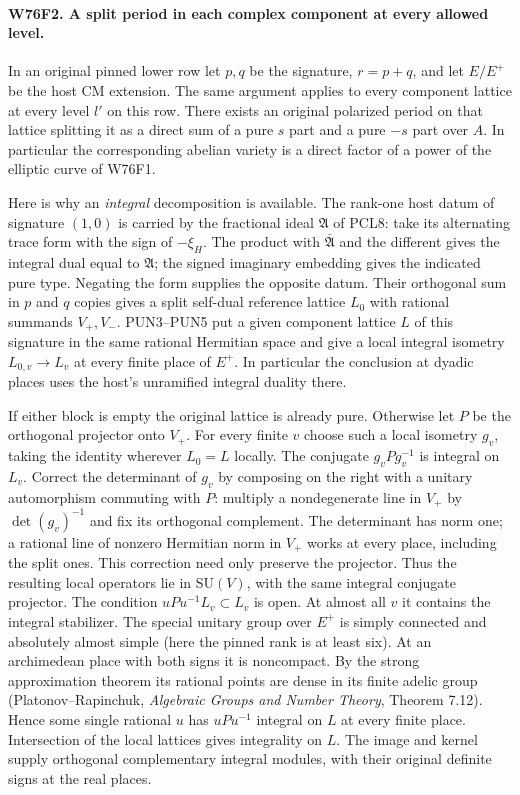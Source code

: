 \paragraph{W76F2. A split period in each complex component at every allowed level.}
In an original pinned lower row let $p,q$ be the signature,
$r=p+q$, and let $E/E^+$ be the host CM extension. The same
argument applies to every component lattice at every level
$l'$ on this row. There exists an original polarized period on
that lattice splitting it as a direct sum of a pure $s$ part
and a pure $-s$ part over $A$. In particular the corresponding
abelian variety is a direct factor of a power of the elliptic
curve of W76F1.

Here is why an \emph{integral} decomposition is available.
The rank-one host datum of signature $(1,0)$ is carried by the
fractional ideal $\mathfrak A$ of PCL8: take its alternating trace
form with the sign of $-\xi_H$. The product with $\bar{\mathfrak A}$
and the different gives the integral dual equal to $\mathfrak A$;
the signed imaginary embedding gives the indicated pure type.
Negating the form supplies the opposite datum. Their orthogonal
sum in $p$ and $q$ copies gives a split self-dual reference lattice
$L_0$ with rational summands $V_+,V_-$. PUN3--PUN5 put a given
component lattice $L$ of this signature in the same rational
Hermitian space and give a local integral isometry $L_{0,v}\to L_v$
at every finite place of $E^+$. In particular the conclusion at
dyadic places uses the host's unramified integral duality there.

If either block is empty the original lattice is already pure.
Otherwise let $P$ be the orthogonal projector onto $V_+$.
For every finite $v$ choose such a local isometry $g_v$,
taking the identity wherever $L_0=L$ locally. The conjugate
$g_v P g_v^{-1}$ is integral on $L_v$. Correct the determinant
of $g_v$ by composing on the right with a unitary automorphism
commuting with $P$: multiply a nondegenerate line in $V_+$ by
$\det(g_v)^{-1}$ and fix its orthogonal complement. The determinant
has norm one; a rational line of nonzero Hermitian norm in
$V_+$ works at every place, including the split ones. This
correction need only preserve the projector. Thus the resulting
local operators lie in $\mathrm{SU}(V)$, with the same integral
conjugate projector. The condition $uPu^{-1}L_v\subset L_v$ is
open. At almost all $v$ it contains the integral stabilizer.
The special unitary group over $E^+$ is simply connected and
absolutely almost simple (here the pinned rank is at least six).
At an archimedean place with both signs it is noncompact.
By the strong approximation theorem its rational points are dense
in its finite adelic group (Platonov--Rapinchuk, \emph{Algebraic
Groups and Number Theory}, Theorem 7.12). Hence some single
rational $u$ has $uPu^{-1}$ integral on $L$ at every finite
place. Intersection of the local lattices gives integrality
on $L$. The image and kernel supply orthogonal complementary
integral modules, with their original definite signs at the
real places.

